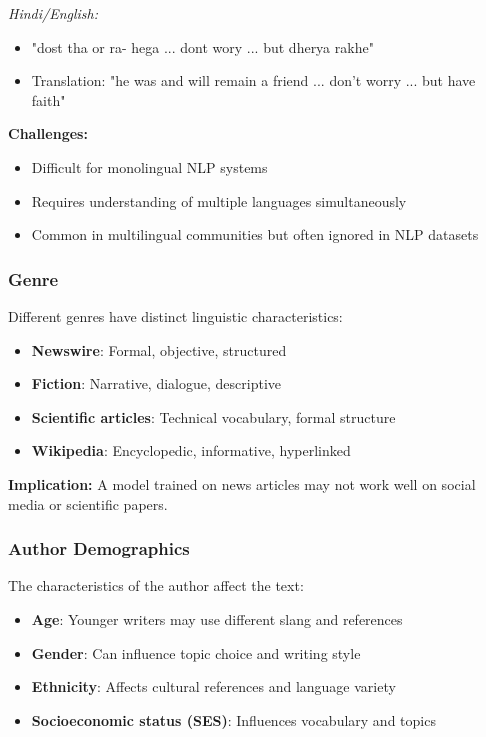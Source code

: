 \documentclass[11pt,a4paper]{article}
\theoremstyle{definition}
\theoremstyle{plain}
\theoremstyle{remark}
\begin{document}
\textit{Hindi/English:}
\begin{itemize}
    \item "dost tha or ra- hega ... dont wory ... but dherya rakhe"
    \item Translation: "he was and will remain a friend ... don't worry ... but have faith"
\end{itemize}

\textbf{Challenges:}
\begin{itemize}
    \item Difficult for monolingual NLP systems
    \item Requires understanding of multiple languages simultaneously
    \item Common in multilingual communities but often ignored in NLP datasets
\end{itemize}

\subsubsection{Genre}

Different genres have distinct linguistic characteristics:
\begin{itemize}
    \item \textbf{Newswire}: Formal, objective, structured
    \item \textbf{Fiction}: Narrative, dialogue, descriptive
    \item \textbf{Scientific articles}: Technical vocabulary, formal structure
    \item \textbf{Wikipedia}: Encyclopedic, informative, hyperlinked
\end{itemize}

\textbf{Implication:} A model trained on news articles may not work well on social media or scientific papers.

\subsubsection{Author Demographics}

The characteristics of the author affect the text:
\begin{itemize}
    \item \textbf{Age}: Younger writers may use different slang and references
    \item \textbf{Gender}: Can influence topic choice and writing style
    \item \textbf{Ethnicity}: Affects cultural references and language variety
    \item \textbf{Socioeconomic status (SES)}: Influences vocabulary and topics
\end{itemize}
\end{document}
